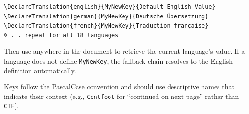 \begin{verbatim}
\DeclareTranslation{english}{MyNewKey}{Default English Value}
\DeclareTranslation{german}{MyNewKey}{Deutsche Übersetzung}
\DeclareTranslation{french}{MyNewKey}{Traduction française}
% ... repeat for all 18 languages
\end{verbatim}

Then use  anywhere in the document to
retrieve the current language's value.  If a language does not define
\texttt{MyNewKey}, the fallback chain resolves to the English
definition automatically.

Keys follow the PascalCase convention and should use descriptive
names that indicate their context (e.g., \texttt{Contfoot} for
``continued on next page'' rather than \texttt{CTF}).
